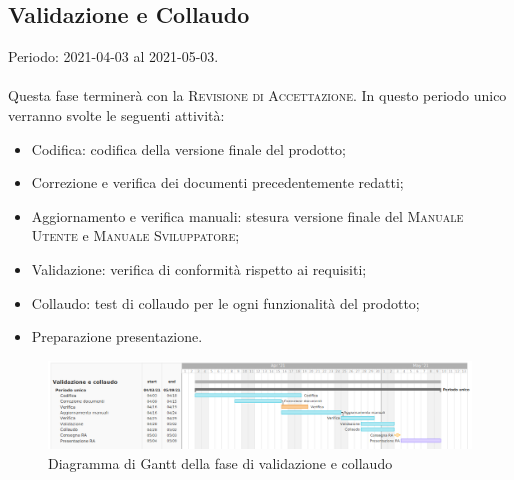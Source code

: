 \documentclass[../piano_di_progetto.tex]{subfiles}
\begin{document}
\subsection{Validazione e Collaudo}%
\label{sub:valid_coll}
Periodo: 2021-04-03 al 2021-05-03.\\ \\ 
Questa fase terminerà con la \textsc{Revisione di Accettazione}. In questo periodo unico verranno svolte le seguenti attività:

\begin{itemize}
    \item Codifica: codifica della versione finale del prodotto;
    \item Correzione e verifica dei documenti precedentemente redatti;
    \item Aggiornamento e verifica manuali: stesura versione finale del \textsc{Manuale Utente} e \textsc{Manuale Sviluppatore};
    \item Validazione: verifica di conformità rispetto ai requisiti;
    \item Collaudo: test di collaudo per le ogni funzionalità del prodotto;
    \item Preparazione presentazione.
\end{itemize}


\begin{figure}[H]
\centering
\includegraphics[width=18cm]{src/img/gantt/04_RA_alternative.png}
\caption{Diagramma di Gantt della fase di validazione e collaudo}
\end{figure}
\end{document}
